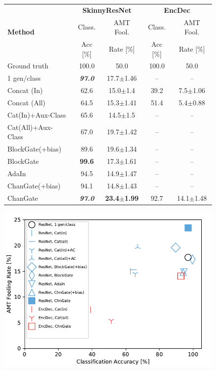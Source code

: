 \begin{figure}[ht]
  \centering
  \begin{minipage}[t]{0.48\linewidth}  
  \centering
  \resizebox{0.9\linewidth}{!} {
  \setlength{\tabcolsep}{6pt}
  \begin{tabular}{l c c c c}
  \toprule
    \multirow{3}{*}{\textbf{Method}} & \multicolumn{2}{c}{ {\bf SkinnyResNet}} & \multicolumn{2}{c}{ {\bf EncDec}} \\ \cmidrule(l){2-3} \cmidrule(l){4-5}
	& Class. & AMT Fool. & Class. & AMT Fool. \\
	& Acc [\%] & Rate [\%] & Acc [\%] & Rate [\%] \\ \midrule
    Ground truth & 100.0 & 50.0 & 100.0 & 50.0 \\ \midrule
    1 gen/class & \textbf{\textit{97.0}} & 17.7$\pm$1.46 & -- & -- \\ \midrule
    Concat (In)	& 62.6 & 15.0$\pm$1.4 & 39.2 & 7.5$\pm$1.06 \\ 
    Concat (All) & 64.5 & 15.3$\pm$1.41 & 51.4 & 5.4$\pm$0.88 \\ \midrule
    Cat(In)+Aux-Class & 65.6 & 14.5$\pm$1.5 & -- & -- \\ 
    Cat(All)+Aux-Class & 67.0 & 19.7$\pm$1.42 & -- & --\\ \midrule
    BlockGate(+bias) & 89.6 & 19.6$\pm$1.34 & -- & --\\ 
    BlockGate & {\bf 99.6} & 17.3$\pm$1.61 & -- & --\\ 
    AdaIn & 94.5 & 14.9$\pm$1.47 & -- & --\\ 
    ChanGate(+bias) & 94.1 & 14.8$\pm$1.43 & -- & --\\ 
    ChanGate & \textbf{\textit{97.0}} & {\bf 23.4$\pm$1.99} & 92.7 & 14.1$\pm$1.48 \\ 
	\hline
	\end{tabular} } 
  \end{minipage}\begin{minipage}[]{0.48\linewidth}
  \centering
  \includegraphics[width=.9\linewidth]{paper_images/gen_real_vs_acc.pdf} 

\end{minipage}
\end{figure}
